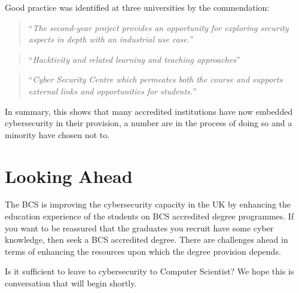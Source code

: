 \documentclass[a4paper,11pt]{article}
\begin{document}
 
Good practice was identified at three universities by the commendation:

 \begin{quote}
``{\emph{The second-year project provides an opportunity for exploring security aspects in depth with an industrial use case.}}''
\end{quote}
\begin{quote}
``{\emph{Hacktivity and related learning and teaching approaches}}''
\end{quote}
\begin{quote}
``{\emph{Cyber Security Centre which permeates both the course and supports external links and opportunities for students.}}''
\end{quote}

In summary, this shows that many accredited institutions have now embedded cybersecurity in their provision, a number are in the process of doing so and a minority have chosen not to. 

\section*{Looking Ahead}

The BCS is improving the cybersecurity capacity in the UK by enhancing the education experience of the students on BCS accredited degree programmes. If you want to be reassured that the graduates you recruit have some cyber knowledge, then seek a BCS accredited degree. There are challenges ahead in terms of enhancing the resources upon which the degree provision depends. 

Is it sufficient to leave to cybersecurity to Computer Scientist? We hope this is conversation that will begin shortly.





\end{document}
